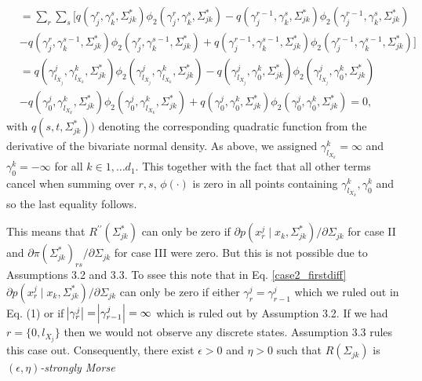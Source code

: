 \begin{condition}
\begin{condition}
\begin{equation*}
\begin{split}
                &= \sum_r\sum_s \Big[q(\gamma_j^r, \gamma_k^s, \Sigma_{jk}^*)\phi_2(\gamma_j^r, \gamma_k^s, \Sigma_{jk}^*) - q(\gamma_j^{r-1}, \gamma_k^s, \Sigma_{jk}^*)\phi_2(\gamma_j^{r-1}, \gamma_k^s, \Sigma_{jk}^*) \\
                &- q(\gamma_j^r, \gamma_k^{s-1}, \Sigma_{jk}^*)\phi_2(\gamma_j^r, \gamma_k^{s-1}, \Sigma_{jk}^*) + q(\gamma_j^{r-1}, \gamma_k^{s-1}, \Sigma_{jk}^*)\phi_2(\gamma_j^{r-1}, \gamma_k^{s-1}, \Sigma_{jk}^*)\Big] \\
                &= q(\gamma^j_{l_{X_j}}, \gamma^k_{l_{X_k}}, \Sigma_{jk}^*)\phi_2(\gamma^j_{l_{X_j}}, \gamma^k_{l_{X_k}}, \Sigma_{jk}^*) - q(\gamma^j_{l_{X_j}}, \gamma^k_0, \Sigma_{jk}^*)\phi_2(\gamma^j_{l_{X_j}}, \gamma^k_0, \Sigma_{jk}^*) \\
                &- q(\gamma^j_0, \gamma^k_{l_{X_k}}, \Sigma_{jk}^*)\phi_2(\gamma^j_0, \gamma^k_{l_{X_k}}, \Sigma_{jk}^*) + q(\gamma^j_0, \gamma^k_0, \Sigma_{jk}^*)\phi_2(\gamma^j_0, \gamma^k_0, \Sigma_{jk}^*) = 0,
            \end{split}
        \end{equation*}
        with $q(s,t,\Sigma_{jk}^*))$ denoting the corresponding quadratic function from the derivative of the bivariate normal density. As above, we assigned $\gamma^k_{l_{X_k}} = \infty$ and $\gamma^k_0 = -\infty$ for all $k \in 1, \dots d_1$. This together with the fact that all other terms cancel when summing over $r,s$, $\phi(\cdot)$ is zero in all points containing $\gamma^k_{l_{X_k}}, \gamma^k_0$ and so the last equality follows.  
        
        This means that $R^{\prime\prime}(\Sigma_{jk}^*)$ can only be zero if $\partial p(x^j_{r} \mid x_{k}, \Sigma_{jk}^*) / \partial \Sigma_{jk}$ for case II and $\partial \pi(\Sigma_{jk}^*)_{rs}/\partial \Sigma_{jk}$ for case III were zero. But this is not possible due to Assumptions 3.2 and 3.3.
        To ssee this note that in Eq. \eqref{case2_firstdiff} $\partial p(x^j_{r} \mid x_{k}, \Sigma_{jk}^*) / \partial \Sigma_{jk}$ can only be zero if either ${\gamma}_r^j = {\gamma}_{r-1}^j$ which we ruled out in Eq. (1) 
        or if $\abs{{\gamma}_r^j} = \abs{{\gamma}_{r-1}^j} = \infty$ which is ruled out by Assumption 3.2.
        If we had $r=\{0,l_{X_j}\}$ then we would not observe any discrete states. Assumption 3.3 
        rules this case out.
        Consequently, there exist $\epsilon > 0$ and $\eta > 0$ such that $R(\Sigma_{jk})$ is $(\epsilon,\eta)$\textit{-strongly Morse}
    \end{condition}
\end{condition}

